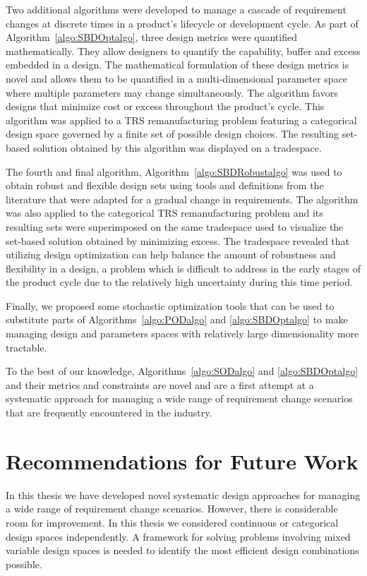 Two additional algorithms were developed to manage a cascade of requirement changes at discrete times in a product's lifecycle or development cycle. As part of Algorithm~\ref{algo:SBDOptalgo}, three design metrics were quantified mathematically. They allow designers to quantify the capability, buffer and excess embedded in a design. The mathematical formulation of these design metrics is novel and allows them to be quantified in a multi-dimensional parameter space where multiple parameters may change simultaneously. The algorithm favors designs that minimize cost or excess throughout the product's cycle. This algorithm was applied to a \ac{TRS} remanufacturing problem featuring a categorical design space governed by a finite set of possible design choices. The resulting set-based solution obtained by this algorithm was displayed on a tradespace.

The fourth and final algorithm, Algorithm~\ref{algo:SBDRobustalgo} was used to obtain robust and flexible design sets using tools and definitions from the literature that were adapted for a gradual change in requirements. The algorithm was also applied to the categorical \ac{TRS} remanufacturing problem and its resulting sets were superimposed on the same tradespace used to visualize the set-based solution obtained by minimizing excess. The tradespace revealed that utilizing design optimization can help balance the amount of robustness and flexibility in a design, a problem which is difficult to address in the early stages of the product cycle due to the relatively high uncertainty during this time period.

Finally, we proposed some stochastic optimization tools that can be used to substitute parts of Algorithms~\ref{algo:PODalgo} and \ref{algo:SBDOptalgo} to make managing design and parameters spaces with relatively large dimensionality more tractable.

To the best of our knowledge, Algorithms~\ref{algo:SODalgo} and \ref{algo:SBDOptalgo} and their metrics and constraints are novel and are a first attempt at a systematic approach for managing a wide range of requirement change scenarios that are frequently encountered in the industry.

\section{Recommendations for Future Work}
\label{sec:futurework}

In this thesis we have developed novel systematic design approaches for managing a wide range of requirement change scenarios. However, there is considerable room for improvement. In this thesis we considered continuous or categorical design spaces independently. A framework for solving problems involving mixed variable design spaces is needed to identify the most efficient design combinations possible. 

